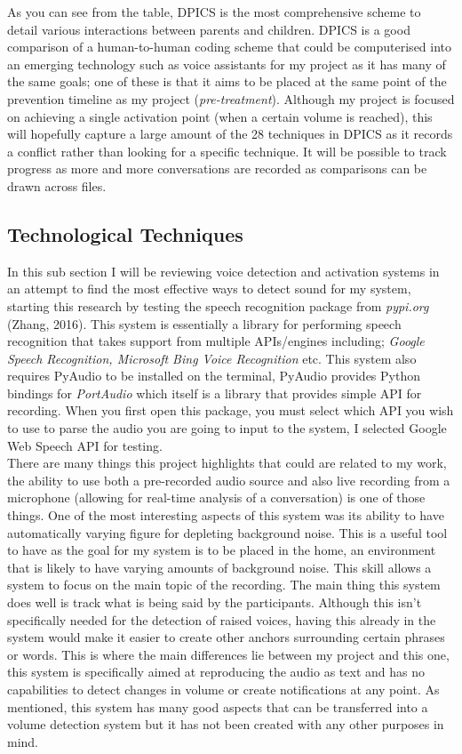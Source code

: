 \documentclass[a4paper,11pt]{report}
\begin{document}
As you can see from the table, DPICS is the most comprehensive scheme to detail various interactions between parents and children. DPICS is a good comparison of a human-to-human coding scheme that could be computerised into an emerging technology such as voice assistants for my project as it has many of the same goals; one of these is that it aims to be placed at the same point of the prevention timeline as my project (\textit{pre-treatment}). Although my project is focused on achieving a single activation point (when a certain volume is reached), this will hopefully capture a large amount of the 28 techniques in DPICS as it records a conflict rather than looking for a specific technique. It will be possible to track progress as more and more conversations are recorded as comparisons can be drawn across files.   \\	

\subsection{Technological Techniques}
In this sub section I will be reviewing voice detection and activation systems in an attempt to find the most effective ways to detect sound for my system, starting this research by testing the speech recognition package from \textit{pypi.org} (Zhang, 2016). This system is essentially a library for performing speech recognition that takes support from multiple APIs/engines including; \textit{Google Speech Recognition, Microsoft Bing Voice Recognition} etc. This system also requires PyAudio to be installed on the terminal, PyAudio provides Python bindings for \textit{PortAudio} which itself is a library that provides simple API for recording. When you first open this package, you must select which API you wish to use to parse the audio you are going to input to the system, I selected Google Web Speech API for testing.\\

There are many things this project highlights that could are related to my work, the ability to use both a pre-recorded audio source and also live recording from a microphone (allowing for real-time analysis of a conversation) is one of those things. One of the most interesting aspects of this system was its ability to have automatically varying figure for depleting background noise. This is a useful tool to have as the goal for my system is to be placed in the home, an environment that is likely to have varying amounts of background noise. This skill allows a system to focus on the main topic of the recording. The main thing this system does well is track what is being said by the participants. Although this isn’t specifically needed for the detection of raised voices, having this already in the system would make it easier to create other anchors surrounding certain phrases or words. This is where the main differences lie between my project and this one, this system is specifically aimed at reproducing the audio as text and has no capabilities to detect changes in volume or create notifications at any point. As mentioned, this system has many good aspects that can be transferred into a volume detection system but it has not been created with any other purposes in mind.\\
\end{document}

